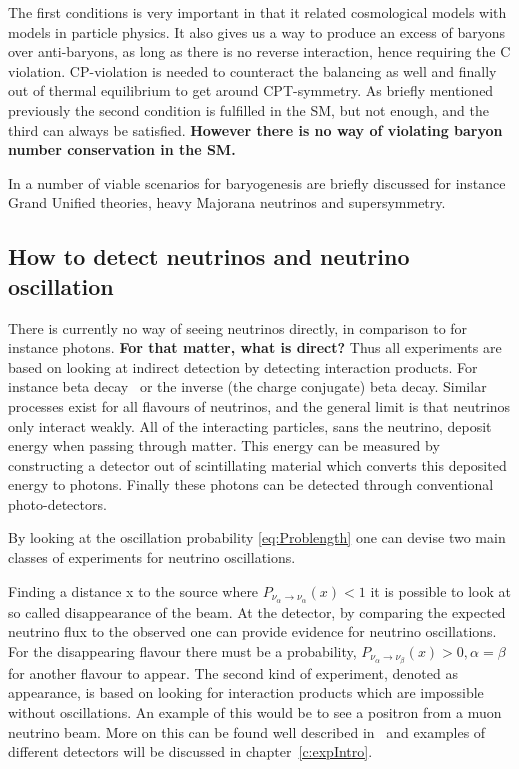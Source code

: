 The first conditions is very important in that it related cosmological models with models in particle physics. It also gives us a way to produce an excess of baryons over anti-baryons, as long as there is no reverse interaction, hence requiring the C violation. CP-violation is needed to counteract the balancing as well and finally out of thermal equilibrium to get around CPT-symmetry. As briefly mentioned previously the second condition is fulfilled in the SM, but not enough, and the third can always be satisfied. \textbf{However there is no way of violating baryon number conservation in the SM.}

In \cite{36CRC} a number of viable scenarios for baryogenesis are briefly discussed for instance Grand Unified theories, heavy Majorana neutrinos and supersymmetry.

\subsection{How to detect neutrinos and neutrino oscillation}
There is currently no way of seeing neutrinos directly, in comparison to for instance photons. \textbf{For that matter, what is direct?} Thus all experiments are based on looking at indirect detection by detecting interaction products. For instance beta decay~ or the inverse (the charge conjugate) beta decay. Similar processes exist for all flavours of neutrinos, and the general limit is that neutrinos only interact weakly. All of the interacting particles, sans the neutrino, deposit energy when passing through matter. This energy can be measured by constructing a detector out of scintillating material which converts this deposited energy to photons. Finally these photons can be detected through conventional photo-detectors.

By looking at the oscillation probability \eqref{eq:Problength} one can devise two main classes of experiments for neutrino oscillations.

Finding a distance x to the source where $P_{\nu_\alpha \rightarrow \nu_\alpha} (x) < 1$ it is possible to look at so called disappearance of the beam. At the detector, by comparing the expected neutrino flux to the observed one can provide evidence for neutrino oscillations. For the disappearing flavour there must be a probability, $P_{\nu_\alpha \rightarrow \nu_\beta} (x) > 0, \alpha=\beta$ for another flavour to appear. The second kind of experiment, denoted as appearance, is based on looking for interaction products which are impossible without oscillations. An example of this would be to see a positron from a muon neutrino beam. More on this can be found well described in~\cite{34doi:10.1142/9789812562203_0002} and examples of different detectors will be discussed in chapter~\ref{c:expIntro}.

